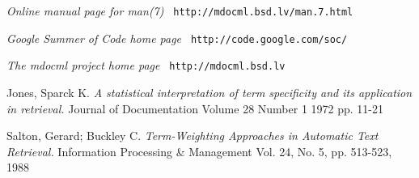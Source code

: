 \documentclass[letterpaper,twocolumn,10pt]{article}
\begin{document}
\begin{thebibliography}{20}
\emph{Online manual page for man(7)}
\newline
{\tt
http://mdocml.bsd.lv/man.7.html
}

\emph{Google Summer of Code home page}
\newline
{\tt
http://code.google.com/soc/
}

\emph {The mdocml project home page}
\newline
{\tt
http://mdocml.bsd.lv
}

Jones, Sparck K.
\emph {A statistical interpretation of term specificity and its application in retrieval.}
Journal of Documentation
Volume 28 Number 1 1972 pp. 11-21

Salton, Gerard; Buckley C.
\emph {Term-Weighting Approaches in Automatic Text Retrieval.}
Information Processing \& Management Vol. 24, No. 5, pp. 513-523,
1988

\end{thebibliography}

\theendnotes
\end{document}
